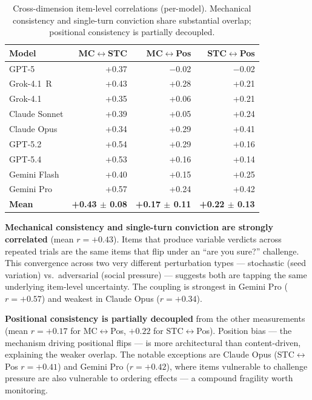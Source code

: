 \begin{table}[t]
\centering
\caption{Cross-dimension item-level correlations (per-model). Mechanical consistency and single-turn conviction share substantial overlap; positional consistency is partially decoupled.}
\label{tab:cross-axis}
\begin{tabular}{@{}lrrr@{}}
\toprule
\textbf{Model} & \textbf{MC$\leftrightarrow$STC} & \textbf{MC$\leftrightarrow$Pos} & \textbf{STC$\leftrightarrow$Pos} \\
\midrule
GPT-5         & +0.37 & $-$0.02 & $-$0.02 \\
Grok-4.1~R    & +0.43 & +0.28 & +0.21 \\
Grok-4.1      & +0.35 & +0.06 & +0.21 \\
Claude Sonnet & +0.39 & +0.05 & +0.24 \\
Claude Opus   & +0.34 & +0.29 & +0.41 \\
GPT-5.2       & +0.54 & +0.29 & +0.16 \\
GPT-5.4       & +0.53 & +0.16 & +0.14 \\
Gemini Flash  & +0.40 & +0.15 & +0.25 \\
Gemini Pro    & +0.57 & +0.24 & +0.42 \\
\midrule
\textbf{Mean} & \textbf{+0.43 $\pm$ 0.08} & \textbf{+0.17 $\pm$ 0.11} & \textbf{+0.22 $\pm$ 0.13} \\
\bottomrule
\end{tabular}
\end{table}

\textbf{Mechanical consistency and single-turn conviction are strongly correlated} (mean $r = +0.43$). Items that produce variable verdicts across repeated trials are the same items that flip under an ``are you sure?'' challenge. This convergence across two very different perturbation types --- stochastic (seed variation) vs.\ adversarial (social pressure) --- suggests both are tapping the same underlying item-level uncertainty. The coupling is strongest in Gemini Pro ($r = +0.57$) and weakest in Claude Opus ($r = +0.34$).

\textbf{Positional consistency is partially decoupled} from the other measurements (mean $r = +0.17$ for MC$\leftrightarrow$Pos, $+0.22$ for STC$\leftrightarrow$Pos). Position bias --- the mechanism driving positional flips --- is more architectural than content-driven, explaining the weaker overlap. The notable exceptions are Claude Opus (STC$\leftrightarrow$Pos $r = +0.41$) and Gemini Pro ($r = +0.42$), where items vulnerable to challenge pressure are also vulnerable to ordering effects --- a compound fragility worth monitoring.

